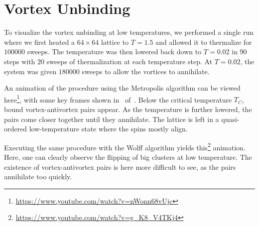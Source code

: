 \section{Vortex Unbinding}\label{sec:vortex_unbinding}
	To visualize the vortex unbinding at low temperatures, we performed a single run where we first heated a $64 \times 64$ lattice  to $T = \num{1.5}$ and allowed it to thermalize for $\num{100 000}$ sweeps. The temperature was then lowered back down to $T = \num{0.02}$ in $90$ steps with $20$ sweeps of thermalization at each temperature step. At $T = \num{0.02}$, the system was given $\num{180 000}$ sweeps to allow the vortices to annihilate.
	
	An animation of the procedure using the Metropolis algorithm can be viewed here\footnote{\url{https://www.youtube.com/watch?v=nWonn68vUjc}}, with some key frames shown in~ of~. Below the critical temperature $T_C$, bound vortex-antivortex pairs appear. As the temperature is further lowered, the pairs come closer together until they annihilate. The lattice is left in a quasi-ordered low-temperature state where the spins mostly align.
	
	Executing the same procedure with the Wolff algorithm yields this\footnote{\url{https://www.youtube.com/watch?v=g_K8_V4TKj4}} animation. Here, one can clearly observe the flipping of big clusters at low temperature. The existence of vortex-antivortex pairs is here more difficult to see, as the pairs annihilate too quickly. 